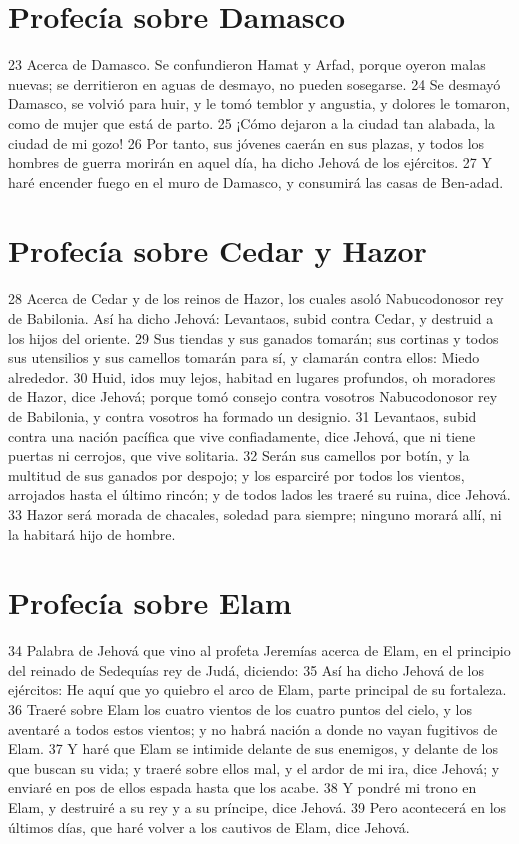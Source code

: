 \section*{Profecía sobre Damasco}

23 Acerca de Damasco. Se confundieron Hamat y Arfad, porque oyeron malas nuevas; se derritieron en aguas de desmayo, no pueden sosegarse.
24 Se desmayó Damasco, se volvió para huir, y le tomó temblor y angustia, y dolores le tomaron, como de mujer que está de parto.
25 ¡Cómo dejaron a la ciudad tan alabada, la ciudad de mi gozo!
26 Por tanto, sus jóvenes caerán en sus plazas, y todos los hombres de guerra morirán en aquel día, ha dicho Jehová de los ejércitos.
27 Y haré encender fuego en el muro de Damasco, y consumirá las casas de Ben-adad.

\section*{Profecía sobre Cedar y Hazor}

28 Acerca de Cedar y de los reinos de Hazor, los cuales asoló Nabucodonosor rey de Babilonia. Así ha dicho Jehová: Levantaos, subid contra Cedar, y destruid a los hijos del oriente.
29 Sus tiendas y sus ganados tomarán; sus cortinas y todos sus utensilios y sus camellos tomarán para sí, y clamarán contra ellos: Miedo alrededor.
30 Huid, idos muy lejos, habitad en lugares profundos, oh moradores de Hazor, dice Jehová; porque tomó consejo contra vosotros Nabucodonosor rey de Babilonia, y contra vosotros ha formado un designio.
31 Levantaos, subid contra una nación pacífica que vive confiadamente, dice Jehová, que ni tiene puertas ni cerrojos, que vive solitaria.
32 Serán sus camellos por botín, y la multitud de sus ganados por despojo; y los esparciré por todos los vientos, arrojados hasta el último rincón; y de todos lados les traeré su ruina, dice Jehová.
33 Hazor será morada de chacales, soledad para siempre; ninguno morará allí, ni la habitará hijo de hombre.

\section*{Profecía sobre Elam}

34 Palabra de Jehová que vino al profeta Jeremías acerca de Elam, en el principio del reinado de Sedequías rey de Judá, diciendo:
35 Así ha dicho Jehová de los ejércitos: He aquí que yo quiebro el arco de Elam, parte principal de su fortaleza.
36 Traeré sobre Elam los cuatro vientos de los cuatro puntos del cielo, y los aventaré a todos estos vientos; y no habrá nación a donde no vayan fugitivos de Elam.
37 Y haré que Elam se intimide delante de sus enemigos, y delante de los que buscan su vida; y traeré sobre ellos mal, y el ardor de mi ira, dice Jehová; y enviaré en pos de ellos espada hasta que los acabe.
38 Y pondré mi trono en Elam, y destruiré a su rey y a su príncipe, dice Jehová.
39 Pero acontecerá en los últimos días, que haré volver a los cautivos de Elam, dice Jehová.

